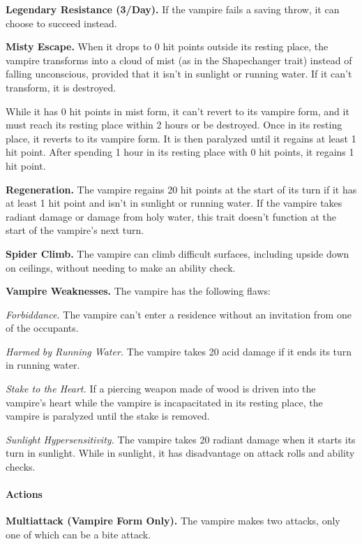 \documentclass[
]{article}
\begin{document}
\textbf{Legendary Resistance (3/Day).} If the vampire fails a saving
throw, it can choose to succeed instead.

\textbf{Misty Escape.} When it drops to 0 hit points outside its resting
place, the vampire transforms into a cloud of mist (as in the
Shapechanger trait) instead of falling unconscious, provided that it
isn't in sunlight or running water. If it can't transform, it is
destroyed.

While it has 0 hit points in mist form, it can't revert to its vampire
form, and it must reach its resting place within 2 hours or be
destroyed. Once in its resting place, it reverts to its vampire form. It
is then paralyzed until it regains at least 1 hit point. After spending
1 hour in its resting place with 0 hit points, it regains 1 hit point.

\textbf{Regeneration.} The vampire regains 20 hit points at the start of
its turn if it has at least 1 hit point and isn't in sunlight or running
water. If the vampire takes radiant damage or damage from holy water,
this trait doesn't function at the start of the vampire's next turn.

\textbf{Spider Climb.} The vampire can climb difficult surfaces,
including upside down on ceilings, without needing to make an ability
check.

\textbf{Vampire Weaknesses.} The vampire has the following flaws:

\emph{Forbiddance.} The vampire can't enter a residence without an
invitation from one of the occupants.

\emph{Harmed by Running Water.} The vampire takes 20 acid damage if it
ends its turn in running water.

\emph{Stake to the Heart.} If a piercing weapon made of wood is driven
into the vampire's heart while the vampire is incapacitated in its
resting place, the vampire is paralyzed until the stake is removed.

\emph{Sunlight Hypersensitivity.} The vampire takes 20 radiant damage
when it starts its turn in sunlight. While in sunlight, it has
disadvantage on attack rolls and ability checks.

\hypertarget{actions}{%
\paragraph{Actions}\label{actions}}

\textbf{Multiattack (Vampire Form Only).} The vampire makes two attacks,
only one of which can be a bite attack.
\end{document}

